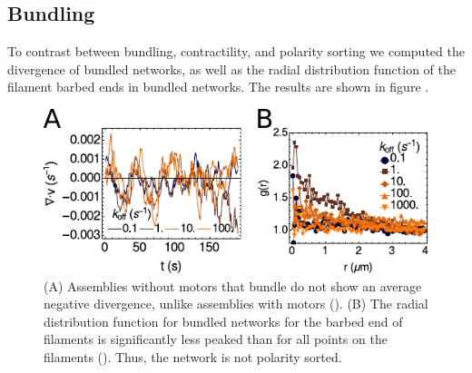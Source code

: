 \documentclass[11pt]{article}
\begin{document}
\subsection{Bundling}
To contrast between bundling, contractility, and polarity sorting
we computed the divergence of bundled networks, as well as the
radial distribution function of the filament barbed ends in bundled
networks. The results are shown in figure . 
\begin{figure}[H] 
  \centering
  \includegraphics[width=\textwidth]{figs/bundling/bundling_supplement.pdf}
  \caption{\label{fig:bundling_supp}
  (A) Assemblies without motors that bundle do not show an average negative divergence, unlike assemblies with motors ().
  (B) The radial distribution function for bundled networks for the barbed end of filaments is significantly less peaked than for all points on the filaments (). Thus, the network is not polarity sorted. 
  }
\end{figure}
\end{document}
